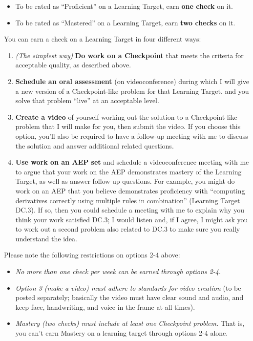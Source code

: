 \documentclass[]{article}
\providecommand{\tightlist}{%
  \setlength{\itemsep}{0pt}\setlength{\parskip}{0pt}}
\begin{document}
\begin{itemize}
\tightlist
\item
  To be rated as ``Proficient'' on a Learning Target, earn \textbf{one
  check} on it.
\item
  To be rated as ``Mastered'' on a Learning Target, earn \textbf{two
  checks} on it.
\end{itemize}

You can earn a check on a Learning Target in four different ways:

\begin{enumerate}
\def\labelenumi{\arabic{enumi}.}
\tightlist
\item
  \emph{(The simplest way)} \textbf{Do work on a Checkpoint} that meets
  the criteria for acceptable quality, as described above.
\item
  \textbf{Schedule an oral assessment} (on videoconference) during which
  I will give a new version of a Checkpoint-like problem for that
  Learning Target, and you solve that problem ``live'' at an acceptable
  level.
\item
  \textbf{Create a video} of yourself working out the solution to a
  Checkpoint-like problem that I will make for you, then submit the
  video. If you choose this option, you'll also be required to have a
  follow-up meeting with me to discuss the solution and answer
  additional related questions.
\item
  \textbf{Use work on an AEP set} and schedule a videoconference meeting
  with me to argue that your work on the AEP demonstrates mastery of the
  Learning Target, as well as answer follow-up questions. For example,
  you might do work on an AEP that you believe demonstrates proficiency
  with ``computing derivatives correctly using multiple rules in
  combination'' (Learning Target DC.3). If so, then you could schedule a
  meeting with me to explain why you think your work satisfied DC.3; I
  would listen and, if I agree, I might ask you to work out a second
  problem also related to DC.3 to make sure you really understand the
  idea.
\end{enumerate}

Please note the following restrictions on options 2-4 above:

\begin{itemize}
\tightlist
\item
  \emph{No more than one check per week can be earned through options
  2-4}.
\item
  \emph{Option 3 (make a video) must adhere to standards for video
  creation} (to be posted separately; basically the video must have
  clear sound and audio, and keep face, handwriting, and voice in the
  frame at all times).
\item
  \emph{Mastery (two checks) must include at least one Checkpoint
  problem.} That is, you can't earn Mastery on a learning target through
  options 2-4 alone.
\end{itemize}
\end{document}
